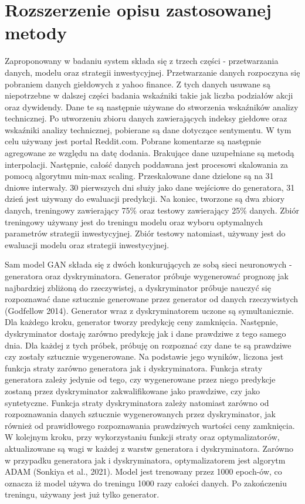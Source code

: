 \documentclass[review]{elsarticle} %
\begin{document}
\section{Rozszerzenie opisu zastosowanej metody}

Zaproponowany w badaniu system składa się z trzech części -  przetwarzania danych, modelu oraz strategii inwestycyjnej. Przetwarzanie danych rozpoczyna się pobraniem danych giełdowych z yahoo finance. Z tych danych usuwane są niepotrzebne w dalszej części badania wskaźniki takie jak liczba podziałów akcji oraz dywidendy. Dane te są następnie używane do stworzenia wskaźników analizy technicznej. Po utworzeniu zbioru danych zawierających indeksy giełdowe oraz wskaźniki analizy technicznej, pobierane są dane dotyczące sentymentu. W tym celu używany jest portal Reddit.com. Pobrane komentarze są następnie agregowane ze względu na datę dodania. Brakujące dane uzupełniane są metodą interpolacji. Następnie, całość danych poddawana jest procesowi skalowania za pomocą algorytmu min-max scaling. Przeskalowane dane dzielone są na 31 dniowe interwały. 30 pierwszych dni służy jako dane wejściowe do generatora, 31 dzień jest używany do ewaluacji predykcji. Na koniec, tworzone są dwa zbiory danych, treningowy zawierający 75\% oraz testowy zawierający 25\% danych. Zbiór treningowy używany jest do treningu modelu oraz wyboru optymalnych parametrów strategii inwestycyjnej. Zbiór testowy natomiast, używany jest do ewaluacji modelu oraz strategii inwestycyjnej. 


Sam model GAN składa się z dwóch konkurujących ze sobą sieci neuronowych - generatora oraz dyskryminatora. Generator próbuje wygenerować prognozę jak najbardziej zbliżoną do rzeczywistej, a dyskryminator próbuje nauczyć się rozpoznawać dane sztucznie generowane przez generator od danych rzeczywistych (Godfellow 2014). Generator wraz z dyskryminatorem uczone są symultanicznie. Dla każdego kroku, generator tworzy predykcję ceny zamknięcia. Następnie, dyskryminator dostaję zarówno predykcję jak i dane prawdziwe z tego samego dnia. Dla każdej z tych próbek, próbuję on rozpoznać czy dane te są prawdziwe czy zostały sztucznie wygenerowane. Na podstawie jego wyników, liczona jest funkcja straty zarówno generatora jak i dyskryminatora. Funkcja straty generatora zależy jedynie od tego, czy wygenerowane przez niego predykcje zostaną przez dyskryminator zakwalifikowane jako prawdziwe, czy jako syntetyczne. Funkcja straty dyskryminatora zależy natomiast zarówno od rozpoznawania danych sztucznie wygenerowanych przez dyskryminator, jak również od prawidłowego rozpoznawania prawdziwych wartości ceny zamknięcia. W kolejnym kroku, przy wykorzystaniu funkcji straty oraz optymalizatorów, aktualizowane są wagi w każdej z warstw generatora i dyskryminatora. Zarówno w przypadku generatora jak i dyskryminatora, optymalizatorem jest algorytm ADAM (Sonkiya et al., 2021).  Model jest trenowany przez 1000 epoch-ów, co oznacza iż model używa do treningu 1000 razy całości danych. Po zakończeniu treningu, używany jest już tylko generator. 
\end{document}
